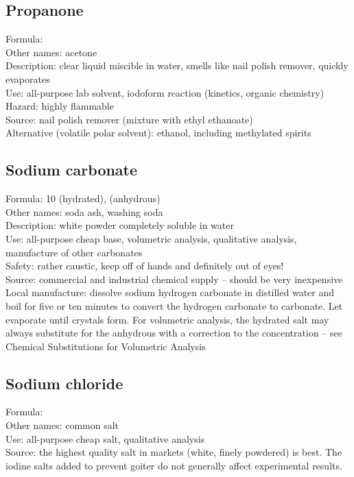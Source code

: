 \subsection{Propanone}
\label{sec:propanone}
Formula: \\
Other names: acetone\\
Description: clear liquid miscible in water, 
smells like nail polish remover, 
quickly evaporates\\
Use: all-purpose lab solvent, 
iodoform reaction (kinetics, organic chemistry)\\
Hazard: highly flammable\\
Source: nail polish remover (mixture with ethyl ethanoate)\\
Alternative (volatile polar solvent): ethanol, 
including methylated spirits
\subsection{Sodium carbonate}
Formula:  10 (hydrated), 
 (anhydrous)\\
Other names: soda ash, washing soda\\
Description: white powder completely soluble in water\\
Use: all-purpose cheap base, 
volumetric analysis, 
qualitative analysis, 
manufacture of other carbonates\\
Safety: rather caustic, keep off of hands and definitely out of eyes!\\
Source: commercial and industrial chemical supply -- 
should be very inexpensive\\
Local manufacture: dissolve sodium hydrogen carbonate in distilled water 
and boil for five or ten minutes 
to convert the hydrogen carbonate to carbonate. 
Let evaporate until crystals form. 
For volumetric analysis, 
the hydrated salt may always substitute 
for the anhydrous with a correction to the concentration -- 
see Chemical Substitutions for Volumetric Analysis
\subsection{Sodium chloride}
Formula: \\
Other names: common salt\\
Use: all-purpose cheap salt, 
qualitative analysis\\
Source: the highest quality salt in markets (white, 
finely powdered) is best. 
The iodine salts added to prevent goiter 
do not generally affect experimental results.
